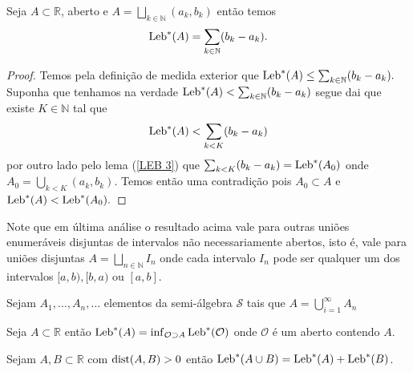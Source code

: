 \begin{lema}\label{LEB 4}
Seja $A\subset \mathbb{R}$,  aberto e 
$A=\bigsqcup_{k\in \mathbb{N}}(a_k,b_k)$ então temos 
$$
\textnormal{Leb}^{*}(A)=\sum_{k\in \mathbb{N}}(b_k-a_k).
$$
\end{lema}

\begin{proof}
Temos pela definição de medida exterior que 
$\textnormal{Leb}^{*}(A)\leq \sum_{k\in \mathbb{N}}(b_k-a_k).$ 
Suponha que tenhamos na verdade 
$\textnormal{Leb}^{*}(A)< \sum_{k\in \mathbb{N}}(b_k-a_k)$ 
segue dai que existe $K\in \mathbb{N}$ tal que 
$$
\textnormal{Leb}^{*}(A)< \sum_{k<K}(b_k-a_k)
$$
 por outro lado pelo lema (\ref{LEB 3}) 
 que $\sum_{k<K}(b_k-a_k)=\textnormal{Leb}^{*}(A_0)$ 
 onde $A_0=\bigcup_{k<K}(a_k,b_k)$.
Temos então uma contradição pois 
$A_0\subset A$ e $\textnormal{Leb}^{*}(A)<\textnormal{Leb}^{*}(A_0).$
\end{proof}

Note que em última análise o resultado acima 
vale para outras uniões enumeráveis disjuntas 
de intervalos não necessariamente abertos, 
isto é, vale para uniões disjuntas 
$A=\bigsqcup_{n\in\mathbb{N}} I_n$ onde 
cada intervalo $I_n$ pode ser qualquer um 
dos intervalos $[a,b),[b,a)$ ou $[a,b]$. 




\begin{proposicao}
Sejam $A_1, \ldots, A_n, \ldots$ elementos da semi-álgebra 
$\mathcal{S}$ tais que $A=\bigcup_{i=1}^{\infty}A_n$


\end{proposicao}




\begin{proposicao}
Seja $A\subset \mathbb{R}$ então 
$ 
\textnormal{Leb}^{*}(A)
=
\inf_{\mathcal{O}\supset A}\textnormal{Leb}^{*}(\mathcal{O})
$ 
onde $\mathcal{O}$ é um aberto contendo $A$.
\end{proposicao}


\begin{proposicao}
Sejam $A,B\subset \mathbb{R}$ com $\textnormal{dist}(A,B)>0$ 
então 
$
\textnormal{Leb}^{*}(A\cup B)
=
\textnormal{Leb}^{*}(A)+\textnormal{Leb}^{*}(B)
$.
\end{proposicao}



